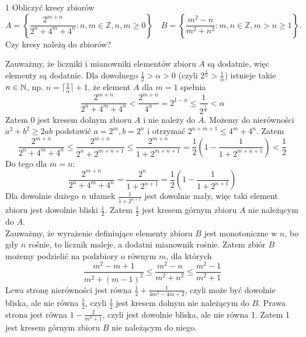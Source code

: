 \documentclass{../note}
\begin{document}
\begin{zadanie}{1}
Obliczyć kresy zbiorów
\[ A = \left\{\frac{2^{m+n}}{2^{n}+4^{m}+4^{n}} : n,m \in \mathbb{Z}, n,m \ge 0\right\} \quad B = \left\{\frac{m^{2}-n}{m^{2}+n^{2}} : m,n \in \mathbb{Z}, m > n \ge 1\right\}. \]
Czy kresy należą do zbiorów?
\end{zadanie}
\begin{rozwiazanie}
Zauważmy, że liczniki i mianowniki elementów zbioru $A$ są dodatnie, więc elementy są dodatnie. Dla dowolnego $\frac12 > \alpha > 0$ (czyli $2^\frac{1}{\alpha} > \frac1\alpha$) istnieje takie $n \in \mathbb{N}$, np. $n = \lceil \frac1\alpha \rceil + 1$, że element $A$ dla $m=1$ spełnia
\[\frac{2^{m+n}}{2^{n}+4^{m}+4^{n}} < \frac{2^{m+n}}{4^{n}} = 2^{1-n} \leq \frac{1}{2^{\frac{1}{\alpha}}} < \alpha\]
Zatem 0 jest kresem dolnym zbioru $A$ i nie należy do $A$. Możemy do nierówności $a^2 + b^2 \geq 2ab$ podstawić $a=2^m, b=2^n$ i otrzymać $2^{n+m+1} \leq 4^m + 4^n$. Zatem
\[\frac{2^{m+n}}{2^{n}+4^{m}+4^{n}} \leq \frac{2^{m+n}}{2^{n}+2^{m+n+1}} \leq \frac{2^{m+n}}{1+2^{m+n+1}} = \frac12\left(1 - \frac1{1+2^{m+n+1}}\right) < \frac12\]
Do tego dla $m=n$:
\[\frac{2^{m+n}}{2^{n}+4^{m}+4^{n}} = \frac{2^{n}}{1+2^{n+1}} = \frac12\left(1 - \frac{1}{1+2^{n+1}}\right)\]
Dla dowolnie dużego $n$ ułamek $\frac{1}{1+2^{n+1}}$ jest dowolnie mały, więc taki element zbioru jest dowolnie bliski $\frac12$. Zatem $\frac12$ jest kresem górnym zbioru $A$ nie należącym do $A$.\\
Zauważmy, że wyrażenie definiujące elementy zbioru $B$ jest monotoniczne w $n$, bo gdy $n$ rośnie, to licznik maleje, a dodatni mianownik rośnie. Zatem zbiór $B$ możemy podzielić na podzbiory o równym $m$, dla których
\[\frac{m^{2}-m+1}{m^{2}+(m-1)^{2}} \leq \frac{m^{2}-n}{m^{2}+n^{2}} \leq \frac{m^{2}-1}{m^{2}+1}\]
Lewa stronę nierówności jest równa $\frac12 + \frac{1}{4m^2-4m+2}$, czyli może być dowolnie bliska, ale nie równa $\frac12$, czyli $\frac12$ jest kresem dolnym nie należącym do $B$. Prawa strona jest równa $1 - \frac{2}{m^2+1}$, czyli jest dowolnie bliska, ale nie równa 1. Zatem 1 jest kresem górnym zbioru $B$ nie należącym do niego.
\end{rozwiazanie}
\end{document}
